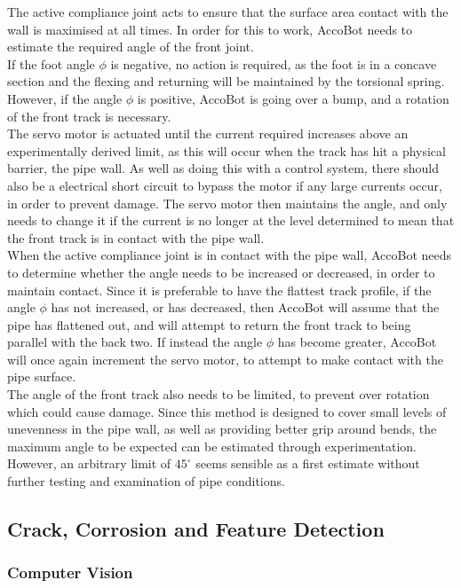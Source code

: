 \documentclass[11pt]{article}		%
\begin{document}
			The active compliance joint acts to ensure that the surface area contact with the wall is maximised at all times.
			In order for this to work, AccoBot needs to estimate the required angle of the front joint.
			\\
			If the foot angle $\phi$ is negative, no action is required, as the foot is in a concave section and the flexing and returning will be maintained by the torsional spring.
			However, if the angle $\phi$ is positive, AccoBot is going over a bump, and a rotation of the front track is necessary.
			\\
			The servo motor is actuated until the current required increases above an experimentally derived limit, as this will occur when the track has hit a physical barrier, the pipe wall.
			As well as doing this with a control system, there should also be a electrical short circuit to bypass the motor if any large currents occur, in order to prevent damage.
			The servo motor then maintains the angle, and only needs to change it if the current is no longer at the level determined to mean that the front track is in contact with the pipe wall.
			\\
			When the active compliance joint is in contact with the pipe wall, AccoBot needs to determine whether the angle needs to be increased or decreased, in order to maintain contact.
			Since it is preferable to have the flattest track profile, if the angle $\phi$ has not increased, or has decreased, then AccoBot will assume that the pipe has flattened out, and will attempt to return the front track to being parallel with the back two.
			If instead the angle $\phi$ has become greater, AccoBot will once again increment the servo motor, to attempt to make contact with the pipe surface.
			\\
			The angle of the front track also needs to be limited, to prevent over rotation which could cause damage.
			Since this method is designed to cover small levels of unevenness in the pipe wall, as well as providing better grip around bends, the maximum angle to be expected can be estimated through experimentation.
			However, an arbitrary limit of $45^\circ$ seems sensible as a first estimate without further testing and examination of pipe conditions.
				
		\subsection{Crack, Corrosion and Feature Detection}
		
		\subsubsection{Computer Vision}
		
\end{document}
